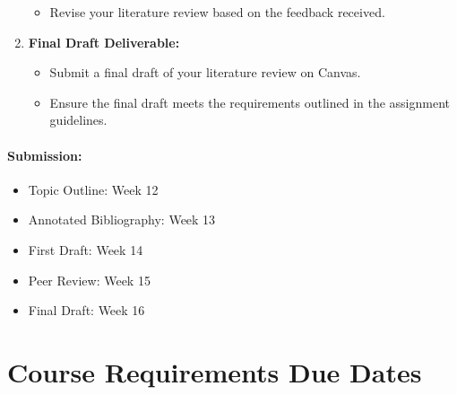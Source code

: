 \documentclass[12pt, letterpaper]{article}
\begin{document}
\begin{enumerate}
\begin{itemize}
        \item Revise your literature review based on the feedback received.
    \end{itemize}
    \item \textbf{Final Draft Deliverable:}
    \begin{itemize}
        \item Submit a final draft of your literature review on Canvas.
        \item Ensure the final draft meets the requirements outlined in the assignment guidelines.
    \end{itemize}
\end{enumerate}

\paragraph*{Submission:}
\begin{itemize}
    \item Topic Outline: Week 12
    \item Annotated Bibliography: Week 13
    \item First Draft: Week 14
    \item Peer Review: Week 15
    \item Final Draft: Week 16
\end{itemize}

\section{Course Requirements Due Dates}
\end{document}
